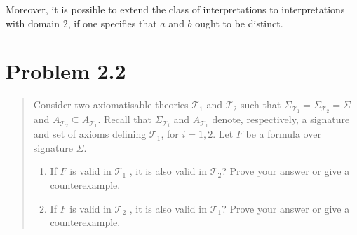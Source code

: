 \documentclass[11pt,a4paper]{article}
\begin{document}
Moreover, it is possible to extend the class of interpretations to interpretations with domain $2$, if one specifies that $a$ and $b$ ought to be distinct.
\section*{Problem 2.2}
\begin{quote}
Consider two axiomatisable theories $\mathcal{T}_1$ and $\mathcal{T}_2$ such that $\Sigma_{\mathcal{T}_1} = \Sigma_{\mathcal{T}_2} = \Sigma$  and $A_{\mathcal{T}_2} \subseteq A_{\mathcal{T}_1}$. Recall that $\Sigma_{\mathcal{T}_i}$ and $A_{\mathcal{T}_1}$ denote, respectively, a signature and set of axioms defining $\mathcal{T}_1$,
for $i = 1, 2$. Let $F$ be a formula over signature $\Sigma$.
\begin{enumerate}
\item If $F$ is valid in $\mathcal{T}_1$ , it is also valid in $\mathcal{T}_2$? Prove your answer or give a counterexample.
\item If $F$ is valid in $\mathcal{T}_2$ , it is also valid in $\mathcal{T}_1$? Prove your answer or give a counterexample.
\end{enumerate}
\end{quote}
\end{document}
